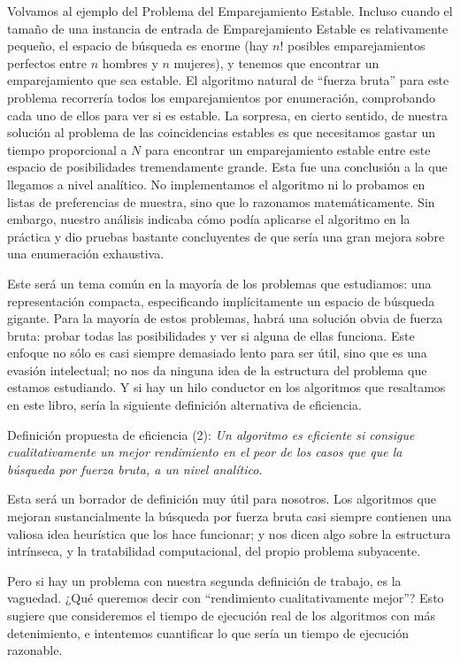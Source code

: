 \documentclass[a4paper, 12pt]{book}
\theoremstyle{dotless}
\begin{document}
Volvamos al ejemplo del Problema del Emparejamiento Estable. Incluso cuando el tamaño de una instancia de entrada de Emparejamiento Estable es relativamente pequeño, el espacio de búsqueda es enorme (hay $n!$ posibles emparejamientos perfectos entre $n$ hombres y $n$ mujeres), y tenemos que encontrar un emparejamiento que sea estable. El algoritmo natural de ``fuerza bruta'' para este problema recorrería todos los emparejamientos por enumeración, comprobando cada uno de ellos para ver si es estable. La sorpresa, en cierto sentido, de nuestra solución al problema de las coincidencias estables es que necesitamos gastar un tiempo proporcional a $N$ para encontrar un emparejamiento estable
entre este espacio de posibilidades tremendamente grande. Esta fue una conclusión a la que llegamos a nivel analítico. No implementamos el algoritmo ni lo probamos en listas de preferencias de muestra, sino que lo razonamos matemáticamente. Sin embargo, nuestro análisis indicaba cómo podía aplicarse el algoritmo en la práctica y dio pruebas bastante concluyentes de que sería una gran mejora sobre una enumeración exhaustiva.

Este será un tema común en la mayoría de los problemas que estudiamos: una representación compacta, especificando implícitamente un espacio de búsqueda gigante. Para la mayoría de estos problemas, habrá una solución obvia de fuerza bruta: probar todas las posibilidades y ver si alguna de ellas funciona. Este enfoque no sólo es casi siempre demasiado lento para ser útil, sino que es una evasión intelectual; no nos da ninguna idea de la estructura del problema que estamos estudiando. 
Y si hay un hilo conductor en los algoritmos que resaltamos en este libro, sería la siguiente definición alternativa de eficiencia.

\vspace{18pt}
Definición propuesta de eficiencia (2): \textit{Un algoritmo es eficiente si consigue cualitativamente un mejor rendimiento en el peor de los casos que que la búsqueda por fuerza bruta, a un nivel analítico.}
\vspace{18pt}

Esta será un borrador de definición muy útil para nosotros. Los algoritmos que mejoran sustancialmente la búsqueda por fuerza bruta casi siempre contienen una valiosa idea heurística que los hace funcionar; y nos dicen algo sobre la estructura intrínseca, y la tratabilidad computacional, del propio problema subyacente. 

Pero si hay un problema con nuestra segunda definición de trabajo, es la vaguedad.
¿Qué queremos decir con ``rendimiento cualitativamente mejor''? Esto sugiere que consideremos el tiempo de ejecución real de los algoritmos con más detenimiento, e intentemos cuantificar lo que sería un tiempo de ejecución razonable.
\end{document}
